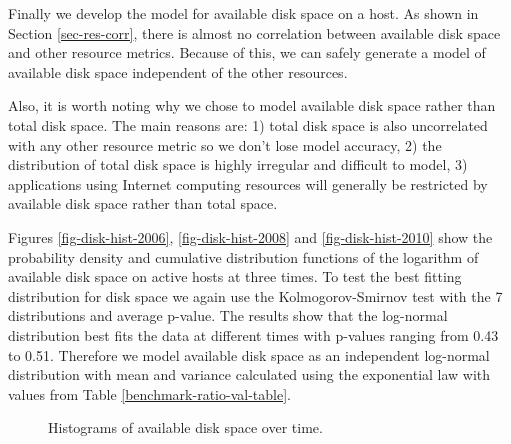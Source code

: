\documentclass[conference]{IEEEtran}
\begin{document}
Finally we develop the model for available disk space on a host.  As shown in Section \ref{sec-res-corr}, there is almost no correlation between available disk space and other resource metrics.  Because of this, we can safely generate a model of available disk space independent of the other resources.

Also, it is worth noting why we chose to model available disk space rather than total disk space.  The main reasons are: 1) total disk space is also uncorrelated with any other resource metric so we don't lose model accuracy, 2) the distribution of total disk space is highly irregular and difficult to model, 3) applications using Internet computing resources will generally be restricted by available disk space rather than total space.

Figures \ref{fig-disk-hist-2006}, \ref{fig-disk-hist-2008}
and \ref{fig-disk-hist-2010} show the probability density and cumulative distribution functions of the logarithm of available disk space on active hosts at three times.
To test the best fitting distribution for disk space we again use the Kolmogorov-Smirnov test with the 7 distributions and average p-value.  The results show that the log-normal distribution best fits the data at different times with p-values ranging from 0.43 to 0.51.  Therefore we model available disk space as an independent log-normal distribution with mean and variance calculated using the exponential law with values from Table \ref{benchmark-ratio-val-table}.

\begin{figure}
\centering
{}
\label{fig-disk-hist-all}
\caption{Histograms of available disk space over time.}
\end{figure}
\end{document}
